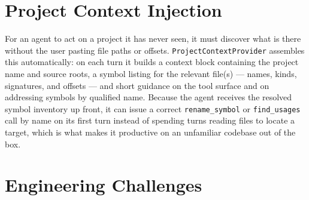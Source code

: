 \section{Project Context Injection}
\label{sec:impl-context}
For an agent to act on a project it has never seen, it must discover what is there
without the user pasting file paths or offsets. \texttt{ProjectContextProvider} assembles
this automatically: on each turn it builds a context block containing the project name
and source roots, a symbol listing for the relevant file(s) --- names, kinds,
signatures, and offsets --- and short guidance on the tool surface and on addressing
symbols by qualified name. Because the agent receives the resolved symbol inventory up
front, it can issue a correct \texttt{rename\_symbol} or \texttt{find\_usages} call by
name on its first turn instead of spending turns reading files to locate a target,
which is what makes it productive on an unfamiliar codebase out of the box.

\section{Engineering Challenges}
\label{sec:impl-challenges}

